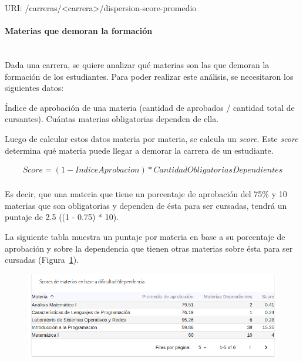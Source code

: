 URI: /carreras/<carrera>/dispersion-score-promedio \\

\paragraph{Materias que demoran la formación}\mbox{}\\

Dada una carrera, se quiere analizar qué materias son las que demoran la formación de los estudiantes. 
Para poder realizar este análisis, se necesitaron los siguientes datos:
\begin{outline}
\1 Índice de aprobación de una materia (cantidad de aprobados / cantidad total de cursantes).
\1 Cuántas materias obligatorias dependen de ella.
\end{outline}

Luego de calcular estos datos materia por materia, se calcula un \textit{score}. Este \textit{score} determina qué materia puede llegar a demorar la carrera de un estudiante.

\begin{align*}
  Score = (1 - IndiceAprobacion) * CantidadObligatoriasDependientes\\
\end{align*}

Es decir, que una materia que tiene un porcentaje de aprobación del 75\% y 10 materias que son obligatorias y dependen de ésta para ser cursadas, tendrá un puntaje de 2.5 ((1 - 0.75) * 10).


La siguiente tabla muestra un puntaje por materia en base a su porcentaje de aprobación y sobre la dependencia que tienen otras materias sobre ésta para ser cursadas  (Figura~\ref{fig:sa-materias-traba}).

\begin{figure}[H]
  \centering
    \includegraphics[scale=0.4]{images/seguimiento-academico/sa-materias-traba.png}
  \label{fig:sa-materias-traba}
\end{figure}

